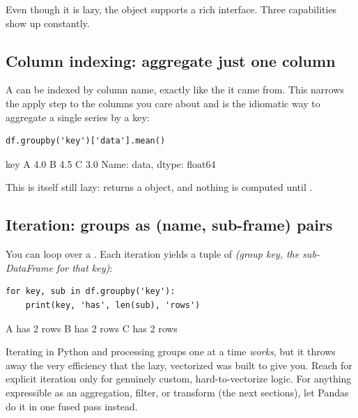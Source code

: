 \documentclass[11pt]{article}
\begin{document}
Even though it is lazy, the  object supports a rich interface. Three capabilities show up constantly.

\subsection{Column indexing: aggregate just one column}

A  can be indexed by column name, exactly like the  it came from. This narrows the apply step to the columns you care about and is the idiomatic way to aggregate a single series by a key:

\begin{lstlisting}
df.groupby('key')['data'].mean()
\end{lstlisting}

\begin{outblock}
key
A    4.0
B    4.5
C    3.0
Name: data, dtype: float64
\end{outblock}

This is itself still lazy:  returns a  object, and nothing is computed until .

\subsection{Iteration: groups as (name, sub-frame) pairs}

You can loop over a . Each iteration yields a tuple of \emph{(group key, the sub-DataFrame for that key)}:

\begin{lstlisting}
for key, sub in df.groupby('key'):
    print(key, 'has', len(sub), 'rows')
\end{lstlisting}

\begin{outblock}
A has 2 rows
B has 2 rows
C has 2 rows
\end{outblock}

\begin{pitfall}
Iterating in Python and processing groups one at a time \emph{works}, but it throws away the very efficiency that the lazy, vectorized  was built to give you. Reach for explicit iteration only for genuinely custom, hard-to-vectorize logic. For anything expressible as an aggregation, filter, or transform (the next sections), let Pandas do it in one fused pass instead.
\end{pitfall}
\end{document}
